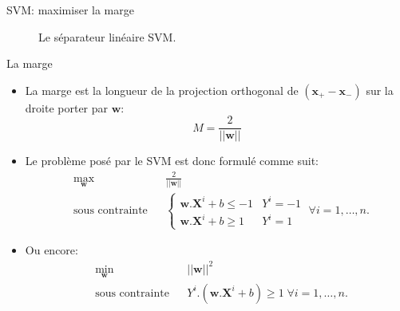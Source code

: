 \documentclass[8pt]{beamer}
\begin{document}
		\begin{frame}[plain]{SVM\@: maximiser la marge}
			\begin{figure}[H]
				
				\caption*{\tiny Le séparateur linéaire SVM.}
			\end{figure}
		\end{frame}

		\begin{frame}{La marge}
			\begin{itemize}
				\item<2-> La marge est la longueur de la projection orthogonal de $(\textbf{x}_+ - \textbf{x}_-)$ sur la droite porter par $\textbf{w}$:
					$$ M = \frac{2}{\vert\vert \textbf{w} \vert\vert} $$
				\item<2->  Le problème posé par le SVM est donc formulé comme suit:
				\begin{equation}
					\begin{aligned}
					& \max_{\textbf{w}}
					& & \frac{2}{\vert\vert \textbf{w} \vert\vert} \\
					& \text{sous contrainte}
					& & \begin{cases}
						\textbf{w}.\textbf{X}^i + b \leq -1 & Y^i = -1 \\
						\textbf{w}.\textbf{X}^i + b \geq 1 & Y^i = 1
					\end{cases} \; \forall i = 1, \dots, n.
					\end{aligned}
				\end{equation}
				\item<2->  Ou encore:
				\begin{equation}
					\begin{aligned}
					& \min_{\textbf{w}}
					& & {\vert\vert \textbf{w} \vert\vert}^2 \\
					& \text{sous contrainte}
					& & Y^i.(\textbf{w}.\textbf{X}^i + b) \geq 1 \; \forall i = 1, \dots, n.
					\end{aligned}
				\end{equation}
			\end{itemize}
		\end{frame}
\end{document}
